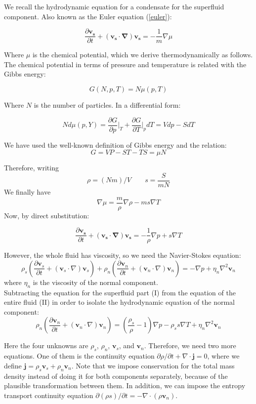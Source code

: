 \documentclass{article}
\begin{document}
We recall the hydrodynamic equation for a condensate for the superfluid component. Also known as the Euler equation (\ref{euler}): 

\[\frac{\partial \mathbf{v_s}}{\partial t} + (\mathbf{v_s}\cdot \mathbf{\nabla})\mathbf{v_s} = -\frac{1}{m}\nabla \mu\]

Where $\mu$ is the chemical potential, which we derive thermodynamically as follows. The chemical potential in terms of pressure and temperature is related with the Gibbs energy:

\[G(N, p, T)= N \mu(p, T)\]

Where $N$ is the number of particles. In a differential form:

\[N d\mu(p, Y) = \frac{\partial G}{\partial p} \bigg|_T + \frac{\partial G}{\partial T}\bigg|_p dT = Vdp - S dT\]

We have used the well-known definition of Gibbs energy and the relation:
\[G = VP - ST - TS = \mu N\]

Therefore, writing 
\[\rho = (Nm)/V \qquad s = \frac{S}{mN}\]
We finally have
\[\nabla \mu = \frac{m}{\rho} \nabla \rho - m s \nabla T\]
Now, by direct substitution:

\[\frac{\partial \mathbf{v_s}}{\partial t} + (\mathbf{v_s}\cdot \mathbf{\nabla})\mathbf{v_s} = -\frac{1}{\rho}\nabla p + s \nabla T \tag{I}\]

However, the whole fluid has viscosity, so we need the Navier-Stokes equation:
\[
\rho_s \left( \frac{\partial \mathbf{v}_s}{\partial t} + (\mathbf{v}_s \cdot \nabla) \mathbf{v}_s \right) + \rho_n \left( \frac{\partial \mathbf{v}_n}{\partial t} + (\mathbf{v}_n \cdot \nabla) \mathbf{v}_n \right) = -\nabla p + \eta_n \nabla^2 \mathbf{v}_n \tag{II}
\]
where $\eta_n$ is the viscosity of the normal component.
\\

Subtracting the equation for the superfluid part (I) from the equation of the entire fluid (II) in order to isolate the hydrodynamic equation of the normal component:
\[
\rho_n \left( \frac{\partial \mathbf{v}_n}{\partial t} + (\mathbf{v}_n \cdot \nabla) \mathbf{v}_n \right) = \left( \frac{\rho_s}{\rho} - 1 \right) \nabla p - \rho_s s \nabla T + \eta_n \nabla^2 \mathbf{v}_n \]

Here the four unknowns are $\rho_s$, $\rho_n$, $\mathbf{v}_s$, and $\mathbf{v}_n$. Therefore, we need two more equations. One of them is the continuity equation $\partial \rho / \partial t + \nabla \cdot \mathbf{j} = 0$, where we define $\mathbf{j} = \rho_s \mathbf{v}_s + \rho_n \mathbf{v}_n $. Note that we impose conservation for the total mass density instead of doing it for both components separately, because of the plausible transformation between them. In addition, we can impose the entropy transport continuity equation $\partial (\rho s) / \partial t = - \nabla \cdot (\rho \mathbf{v}_n)$.
\end{document}
